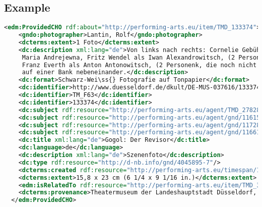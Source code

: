 \documentclass[12pt, a4paper, margin=2in]{report}
\begin{document}
\subsection*{Example}
\begin{lstlisting}[language=XML]
<edm:ProvidedCHO rdf:about="http://performing-arts.eu/item/TMD_133374">
    <gndo:photographer>Lantin, Rolf</gndo:photographer>
    <dcterms:extent>1 Foto</dcterms:extent>
    <dc:description xml:lang="de">Von links nach rechts: Cornelie Gebühr als Anna Andrejewna, Ehmi Bessel als
     Maria Andrejewna, Fritz Wendel als Iwan Alexandrowitsch, (2 Personen, die noch nicht identifiziert sind),
     Franz Everth als Anton Antonowitsch, (2 Personenk, die noch nicht identifiziert sind). Alle Personen sitzen
     auf einer Bank nebeneinander.</dc:description>
    <dc:format>Schwarz-Wei\ss{} Fotografie auf Tonpapier</dc:format>
    <dc:identifier>http://www.duesseldorf.de/dkult/DE-MUS-037616/133374</dc:identifier>
    <dc:identifier>TM_F63</dc:identifier>
    <dc:identifier>133374</dc:identifier>
    <dc:subject rdf:resource="http://performing-arts.eu/agent/TMD_27828"/>
    <dc:subject rdf:resource="http://performing-arts.eu/agent/gnd/116154519"/>
    <dc:subject rdf:resource="http://performing-arts.eu/agent/gnd/117284440"/>
    <dc:subject rdf:resource="http://performing-arts.eu/agent/gnd/116612355"/>
    <dc:title xml:lang="de">Gogol: Der Revisor</dc:title>
    <dc:language>de</dc:language>
    <dc:description xml:lang="de">Szenenfoto</dc:description>
    <dc:type rdf:resource="http://d-nb.info/gnd/4045895-7"/>
    <dcterms:created rdf:resource="http://performing-arts.eu/timespan/1927-01-01T00:00:00Z_1927-31-12T23:59:59Z"/>
    <dcterms:extent>15,8 x 23 cm (6 1/4 x 9 1/16 in.)</dcterms:extent>
    <edm:isRelatedTo rdf:resource="http://performing-arts.eu/item/TMD_32300"/>
    <dcterms:provenance>Theatermuseum der Landeshauptstadt Düsseldorf, Düsseldorf</dcterms:provenance>
  </edm:ProvidedCHO>
\end{lstlisting}

\newpage
\end{document}
